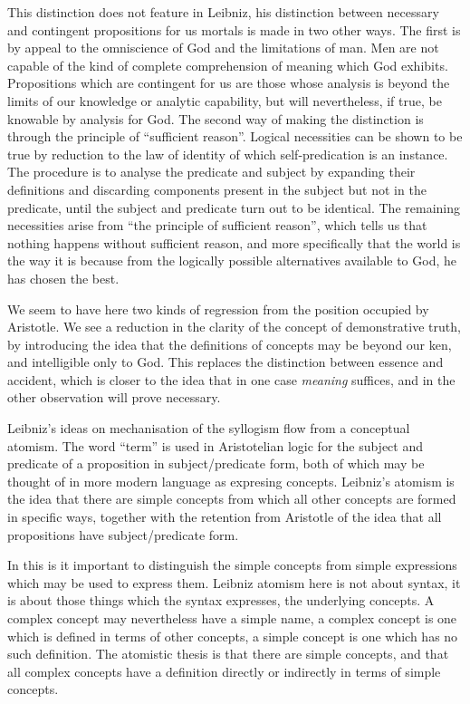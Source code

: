 This distinction does not feature in Leibniz, his distinction between necessary and contingent propositions for us mortals is made in two other ways.
The first is by appeal to the omniscience of God and the limitations of man.
Men are not capable of the kind of complete comprehension of meaning which God exhibits.
Propositions which are contingent for us are those whose analysis is beyond the limits of our knowledge or analytic capability, but will nevertheless, if true, be knowable by analysis for God.
The second way of making the distinction is through the principle of ``sufficient reason''.
Logical necessities can be shown to be true by reduction to the law of identity of which self-predication is an instance.
The procedure is to analyse the predicate and subject by expanding their definitions and discarding components present in the subject but not in the predicate, until the subject and predicate turn out to be identical.
The remaining necessities arise from ``the principle of sufficient reason'', which tells us that nothing happens without sufficient reason, and more specifically that the world is the way it is because from the logically possible alternatives available to God, he has chosen the best.

We seem to have here two kinds of regression from the position occupied by Aristotle.
We see a reduction in the clarity of the concept of demonstrative truth, by introducing the idea that the definitions of concepts may be beyond our ken, and intelligible only to God.
This replaces the distinction between essence and accident, which is closer to the idea that in one case \emph{meaning} suffices, and in the other observation will prove necessary.

Leibniz's ideas on mechanisation of the syllogism flow from a conceptual atomism.
The word ``term'' is used in Aristotelian logic for the subject and predicate of a proposition in subject/predicate form, both of which may be thought of in more modern language as expresing concepts.
Leibniz's atomism is the idea that there are simple concepts from which all other concepts are formed in specific ways, together with the retention from Aristotle of the idea that all propositions have subject/predicate form.

In this is it important to distinguish the simple concepts from simple expressions which may be used to express them.
Leibniz atomism here is not about syntax, it is about those things which the syntax expresses, the underlying concepts.
A complex concept may nevertheless have a simple name, a complex concept is one which is defined in terms of other concepts, a simple concept is one which has no such definition.
The atomistic thesis is that there are simple concepts, and that all complex concepts have a definition directly or indirectly in terms of simple concepts.

